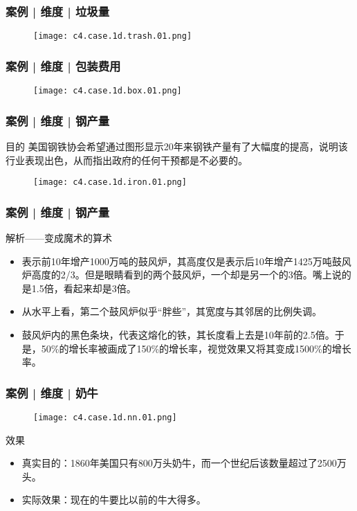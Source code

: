 \begin{frame}
  \frametitle{案例 | 维度 | 垃圾量}
  \begin{figure}
    \centering
    \texttt{[image: c4.case.1d.trash.01.png]}
  \end{figure}
\end{frame}

\begin{frame}
  \frametitle{案例 | 维度 | 包装费用}
  \begin{figure}
    \centering
    \texttt{[image: c4.case.1d.box.01.png]}
  \end{figure}
\end{frame}

\begin{frame}
  \frametitle{案例 | 维度 | 钢产量}
  \begin{block}{目的}
    美国钢铁协会希望通过图形显示20年来钢铁产量有了大幅度的提高，说明该行业表现出色，从而指出政府的任何干预都是不必要的。
  \end{block}
  \vspace{-0.5em}
  \begin{figure}
    \centering
    \texttt{[image: c4.case.1d.iron.01.png]}
  \end{figure}
\end{frame}

\begin{frame}
  \frametitle{案例 | 维度 | 钢产量}
  \begin{block}{解析——变成魔术的算术}
    \begin{itemize}
      \item 表示前10年增产1000万吨的鼓风炉，其高度仅是表示后10年增产1425万吨鼓风炉高度的2/3。但是眼睛看到的两个鼓风炉，一个却是另一个的3倍。嘴上说的是1.5倍，看起来却是3倍。
      \item 从水平上看，第二个鼓风炉似乎“胖些”，其宽度与其邻居的比例失调。
      \item 鼓风炉内的黑色条块，代表这熔化的铁，其长度看上去是10年前的2.5倍。于是，50\%的增长率被画成了150\%的增长率，视觉效果又将其变成1500\%的增长率。
    \end{itemize}
  \end{block}
\end{frame}

\begin{frame}
  \frametitle{案例 | 维度 | 奶牛}
  \begin{figure}
    \centering
    \texttt{[image: c4.case.1d.nn.01.png]}
  \end{figure}
  \vspace{-1em}
  \pause \pause \pause \pause
  \begin{block}{效果}
    \begin{itemize}
      \item 真实目的：1860年美国只有800万头奶牛，而一个世纪后该数量超过了2500万头。
      \item 实际效果：现在的牛要比以前的牛大得多。
    \end{itemize}
  \end{block}
\end{frame}


